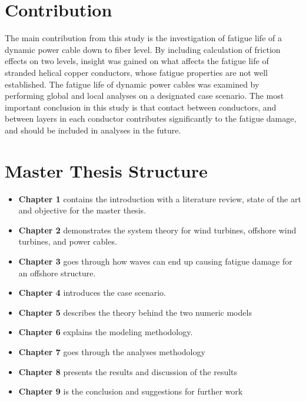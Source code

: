 \section{Contribution}
The main contribution from this study is the investigation of fatigue life of a dynamic power cable down to fiber level. By including calculation of friction effects on two levels, insight was gained on what affects the fatigue life of stranded helical copper conductors, whose fatigue properties are not well established. The fatigue life of dynamic power cables was examined by performing global and local analyses on a designated case scenario. The most important conclusion in this study is that contact between conductors, and between layers in each conductor contributes significantly to the fatigue damage, and should be included in analyses in the future. 
\section{Master Thesis Structure}
\begin{itemize}
    \item \textbf{Chapter 1} contains the introduction with a literature review, state of the art and objective for the master thesis.
     \item \textbf{Chapter 2} demonstrates the system theory for wind turbines, offshore wind turbines, and power cables.
      \item \textbf{Chapter 3} goes through how waves can end up causing fatigue damage for an offshore structure. 
      \item \textbf{Chapter 4} introduces the case scenario.
      \item \textbf{Chapter 5} describes the theory behind the two numeric models
      \item \textbf{Chapter 6} explains the modeling methodology.
      \item \textbf{Chapter 7} goes through the analyses methodology
      \item \textbf{Chapter 8} presents the results and discussion of the results
      \item \textbf{Chapter 9} is the conclusion and suggestions for further work
\end{itemize}



